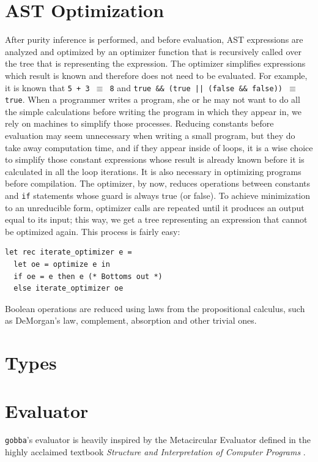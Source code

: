 \documentclass[a4paper, 10pt]{article}
\theoremstyle{plain}%
\theoremstyle{definition}
\theoremstyle{remark}
\begin{document}
\begin{multicols}{2}
\section{AST Optimization}
After purity inference is performed, and before evaluation, AST expressions are analyzed and optimized by an
optimizer function that is recursively called over the tree that is representing
the expression. The optimizer simplifies expressions which result is known and
therefore does not need to be evaluated. For example, it is known that \texttt{5
+ 3 $\equiv$ 8} and \texttt{true \&\& (true || (false \&\& false)) $\equiv$
true}. When a programmer writes a program, she or he may not want to do all the
simple calculations before writing the program in which they appear in, we rely
on machines to simplify those processes. Reducing constants before evaluation
may seem unnecessary when writing a small program, but they do take away
computation time, and if they appear inside of loops, it is a wise choice to
simplify those constant expressions whose result is already known before it is
calculated in all the loop iterations. It is also necessary in optimizing
programs before compilation. The optimizer, by now, reduces operations between
constants and \texttt{if} statements whose guard is always true (or false). To
achieve minimization to an unreducible form, optimizer calls are repeated until
it produces an output equal to its input; this way, we get a tree representing
an expression that cannot be optimized again. This process is fairly easy:

\begin{lstlisting}[style=caml]
let rec iterate_optimizer e =
  let oe = optimize e in
  if oe = e then e (* Bottoms out *)
  else iterate_optimizer oe
\end{lstlisting}

Boolean operations are reduced using laws from the propositional calculus, such as DeMorgan's law, complement, absorption and other trivial ones.

\section{Types}

\section{Evaluator}
\texttt{gobba}'s evaluator is heavily inspired by the Metacircular Evaluator defined in the
highly acclaimed textbook \textit{Structure and Interpretation of Computer Programs} \cite{Abelson1996}.


\end{multicols}
\end{document}
